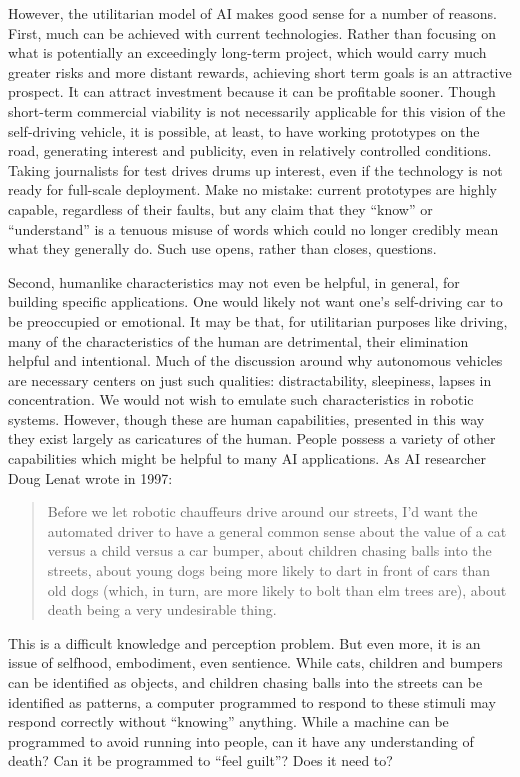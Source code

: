 However, the utilitarian model of AI makes good sense for a number of reasons.
First, much can be achieved with current technologies. Rather than
focusing on what is potentially an exceedingly long-term project,
which would carry much greater risks and more distant rewards,
achieving short term goals is an 
attractive prospect. It can attract investment because it can be
profitable sooner. Though short-term commercial viability is not
necessarily applicable for this vision of the self-driving vehicle, it
is possible, at least, to have working prototypes on the road, generating
interest and publicity, even in relatively controlled conditions. Taking
journalists for test drives drums up interest, even if the technology
is not ready for full-scale deployment. Make no mistake: current
prototypes are highly capable, regardless of their faults, but any claim that
they ``know'' or ``understand'' is a tenuous misuse of words which
could no longer credibly mean what they generally do. Such use opens,
rather than closes, questions.

Second, humanlike characteristics may not even be helpful, in general, for building
specific applications. One would likely not want one's self-driving car
to be preoccupied or emotional.\cite{???-wiredFutureofAI} It may be that, for utilitarian
purposes like driving, many of the characteristics of the human are
detrimental, their elimination helpful and intentional. Much of the
discussion around why autonomous vehicles are necessary centers on
just such qualities: distractability, sleepiness, lapses in
concentration.\cite{???} We would not wish to emulate such
characteristics in robotic systems. However, though these are human
capabilities, presented in this way they exist largely as caricatures
of the human. People possess a
variety of other capabilities which might be helpful to many AI
applications. As AI researcher Doug Lenat wrote in 1997:
\begin{quote}
Before we let robotic chauffeurs drive around our streets, I'd want the
  automated driver to have a general common sense about the value of a
cat versus a child versus a car bumper, about children chasing balls
into the streets, about young dogs being more likely to dart in front
of cars than old dogs (which, in turn, are more likely to bolt than
elm trees are), about death being a very undesirable thing.\cite[p.
  122]{ekbia}\end{quote} 

This is a difficult knowledge and perception problem. But even more,
it is an issue of selfhood, embodiment, even sentience. While cats,
children and bumpers can be identified as objects, and children
chasing balls into the streets can be identified as patterns, a
computer programmed to respond to these stimuli may respond correctly
without ``knowing'' anything. While a machine can be programmed to avoid
running into people, can it have any understanding of death? Can it be
programmed to ``feel guilt''? Does it need to?

